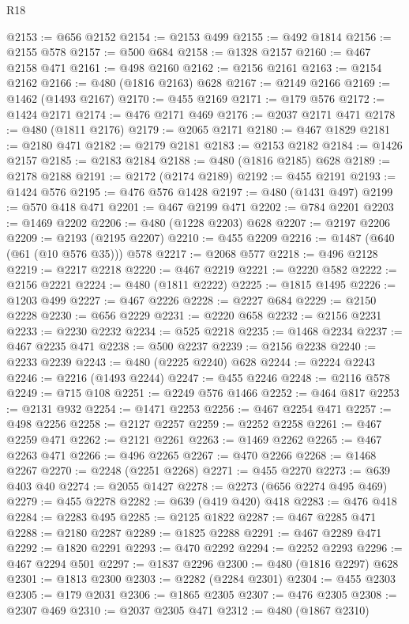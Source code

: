 \begin{lexlean}{R18}
\begin{coremodule}
{{{{{{{{{{{{{{{{{{{{{{{{{{{{{{{{{{{{{{{{{{{{{{{{{{{{{{{{{{{{{{{{{{{{{{{{{{{{{{{{{{{{{{{{{{{{{{{{{{{{{{{{{{{{{@2153 := @656 @2152
@2154 := @2153 @499
@2155 := @492 @1814
@2156 := @2155 @578
@2157 := @500 @684
@2158 := @1328 @2157
@2160 := @467 @2158 @471
@2161 := @498 @2160
@2162 := @2156 @2161
@2163 := @2154 @2162
@2166 := @480 (@1816 @2163) @628
@2167 := @2149 @2166
@2169 := @1462 (@1493 @2167)
@2170 := @455 @2169
@2171 := @179 @576
@2172 := @1424 @2171
@2174 := @476 @2171 @469
@2176 := @2037 @2171 @471
@2178 := @480 (@1811 @2176)
@2179 := @2065 @2171
@2180 := @467 @1829
@2181 := @2180 @471
@2182 := @2179 @2181
@2183 := @2153 @2182
@2184 := @1426 @2157
@2185 := @2183 @2184
@2188 := @480 (@1816 @2185) @628
@2189 := @2178 @2188
@2191 := @2172 (@2174 @2189)
@2192 := @455 @2191
@2193 := @1424 @576
@2195 := @476 @576 @1428
@2197 := @480 (@1431 @497)
@2199 := @570 @418 @471
@2201 := @467 @2199 @471
@2202 := @784 @2201
@2203 := @1469 @2202
@2206 := @480 (@1228 @2203) @628
@2207 := @2197 @2206
@2209 := @2193 (@2195 @2207)
@2210 := @455 @2209
@2216 := @1487 (@640 (@61 (@10 @576 @35))) @578
@2217 := @2068 @577
@2218 := @496 @2128
@2219 := @2217 @2218
@2220 := @467 @2219
@2221 := @2220 @582
@2222 := @2156 @2221
@2224 := @480 (@1811 @2222)
@2225 := @1815 @1495
@2226 := @1203 @499
@2227 := @467 @2226
@2228 := @2227 @684
@2229 := @2150 @2228
@2230 := @656 @2229
@2231 := @2220 @658
@2232 := @2156 @2231
@2233 := @2230 @2232
@2234 := @525 @2218
@2235 := @1468 @2234
@2237 := @467 @2235 @471
@2238 := @500 @2237
@2239 := @2156 @2238
@2240 := @2233 @2239
@2243 := @480 (@2225 @2240) @628
@2244 := @2224 @2243
@2246 := @2216 (@1493 @2244)
@2247 := @455 @2246
@2248 := @2116 @578
@2249 := @715 @108
@2251 := @2249 @576 @1466
@2252 := @464 @817
@2253 := @2131 @932
@2254 := @1471 @2253
@2256 := @467 @2254 @471
@2257 := @498 @2256
@2258 := @2127 @2257
@2259 := @2252 @2258
@2261 := @467 @2259 @471
@2262 := @2121 @2261
@2263 := @1469 @2262
@2265 := @467 @2263 @471
@2266 := @496 @2265
@2267 := @470 @2266
@2268 := @1468 @2267
@2270 := @2248 (@2251 @2268)
@2271 := @455 @2270
@2273 := @639 @403 @40
@2274 := @2055 @1427
@2278 := @2273 (@656 @2274 @495 @469)
@2279 := @455 @2278
@2282 := @639 (@419 @420) @418
@2283 := @476 @418
@2284 := @2283 @495
@2285 := @2125 @1822
@2287 := @467 @2285 @471
@2288 := @2180 @2287
@2289 := @1825 @2288
@2291 := @467 @2289 @471
@2292 := @1820 @2291
@2293 := @470 @2292
@2294 := @2252 @2293
@2296 := @467 @2294 @501
@2297 := @1837 @2296
@2300 := @480 (@1816 @2297) @628
@2301 := @1813 @2300
@2303 := @2282 (@2284 @2301)
@2304 := @455 @2303
@2305 := @179 @2031
@2306 := @1865 @2305
@2307 := @476 @2305
@2308 := @2307 @469
@2310 := @2037 @2305 @471
@2312 := @480 (@1867 @2310)
}}}}}}}}}}}}}}}}}}}}}}}}}}}}}}}}}}}}}}}}}}}}}}}}}}}}}}}}}}}}}}}}}}}}}}}}}}}}}}}}}}}}}}}}}}}}}}}}}}}}}}}}}}}}}
\end{coremodule}
\end{lexlean}
